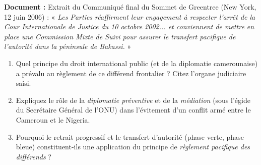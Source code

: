 \documentclass[11pt]{article}
\begin{document}
\begin{exercice}
\textbf{Document :} Extrait du Communiqué final du Sommet de Greentree (New York, 12 juin 2006) : « \emph{Les Parties réaffirment leur engagement à respecter l'arrêt de la Cour Internationale de Justice du 10 octobre 2002... et conviennent de mettre en place une Commission Mixte de Suivi pour assurer le transfert pacifique de l'autorité dans la péninsule de Bakassi.} »

\begin{enumerate}
    \item Quel principe du droit international public (et de la diplomatie camerounaise) a prévalu au règlement de ce différend frontalier ? Citez l'organe judiciaire saisi.
    \item Expliquez le rôle de la \emph{diplomatie préventive} et de la \emph{médiation} (sous l'égide du Secrétaire Général de l'ONU) dans l'évitement d'un conflit armé entre le Cameroun et le Nigeria.
    \item Pourquoi le retrait progressif et le transfert d'autorité (phase verte, phase bleue) constituent-ils une application du principe de \emph{règlement pacifique des différends} ?
\end{enumerate}
\end{exercice}
\end{document}
